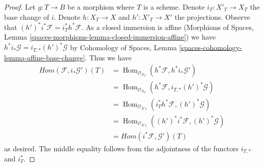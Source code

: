 \documentclass{stacks-project}
\theoremstyle{plain}
\theoremstyle{definition}
\theoremstyle{remark}
\numberwithin{equation}{subsection}
\def\Hom{\mathop{\mathrm{Hom}}\nolimits}
\begin{document}
\begin{proof}
Let $g : T \to B$ be a morphism where $T$ is a scheme.
Denote $i_T : X'_T \to X_T$ the base change of $i$.
Denote $h : X_T \to X$ and $h' : X'_T \to X'$ the projections.
Observe that $(h')^*i^*\mathcal{F} = i_T^*h^*\mathcal{F}$.
As a closed immersion is affine
(Morphisms of Spaces, Lemma
\ref{spaces-morphisms-lemma-closed-immersion-affine})
we have $h^*i_*\mathcal{G} = i_{T, *}(h')^*\mathcal{G}$ by
Cohomology of Spaces, Lemma \ref{spaces-cohomology-lemma-affine-base-change}.
Thus we have
\begin{align*}
\mathit{Hom}(\mathcal{F}, i_*\mathcal{G}')(T)
& =
\Hom_{\mathcal{O}_{X_T}}(h^*\mathcal{F}, h^*i_*\mathcal{G}') \\
& =
\Hom_{\mathcal{O}_{X_T}}(h^*\mathcal{F}, i_{T, *}(h')^*\mathcal{G}) \\
& =
\Hom_{\mathcal{O}_{X'_T}}(i_T^*h^*\mathcal{F}, (h')^*\mathcal{G}) \\
& =
\Hom_{\mathcal{O}_{X'_T}}((h')^*i^*\mathcal{F}, (h')^*\mathcal{G}) \\
& =
\mathit{Hom}(i^*\mathcal{F}, \mathcal{G}')(T)
\end{align*}
as desired. The middle equality follows from the adjointness of the functors
$i_{T, *}$ and $i_T^*$.
\end{proof}
\end{document}
